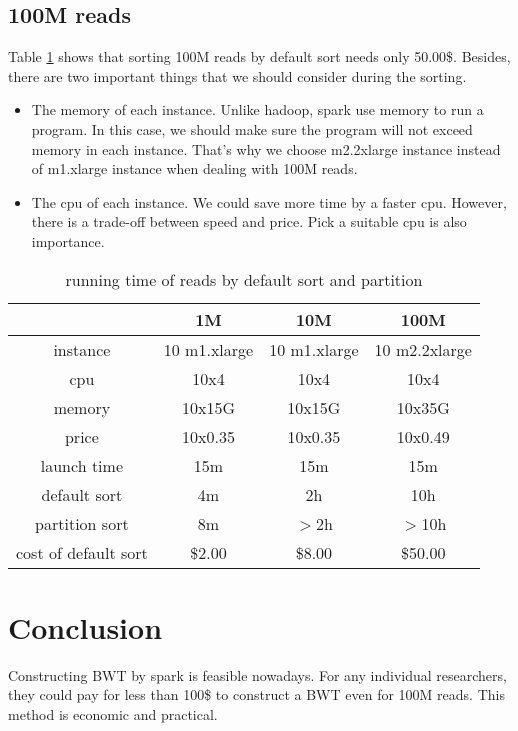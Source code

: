\documentclass[11pt,letterpaper]{article}
\begin{document}
\subsection{100M reads}
Table \ref{100M reads} shows that sorting 100M reads by default sort needs only 50.00\$. Besides, there are two important things that we should consider during the sorting. 
\begin{itemize}
	\item
	The memory of each instance. Unlike hadoop, spark use memory to run a program. In this case, we should make sure the program will not exceed memory in each instance. That's why we choose m2.2xlarge instance instead of m1.xlarge instance when dealing with 100M reads.
	\item
	The cpu of each instance. We could save more time by a faster cpu. However, there is a trade-off between speed and price. Pick a suitable cpu is also importance.
\end{itemize}
\begin{table}
	\caption{running time of reads by default sort and partition}
	\label{100M reads}
	\center
	\begin{tabular}{|c|c|c|c|}
		\hline
	     & 1M & 10M & 100M \\ \hline
		instance & 10 m1.xlarge & 10 m1.xlarge & 10 m2.2xlarge \\ \hline
    	cpu & 10x4 & 10x4 & 10x4 \\ \hline
		memory & 10x15G & 10x15G & 10x35G \\ \hline
		price & 10x0.35 & 10x0.35 & 10x0.49 \\ \hline
		\hline
		launch time & 15m & 15m & 15m \\ \hline
		default sort & 4m & 2h & 10h \\ \hline
		partition sort & 8m & $>$2h & $>$10h \\ \hline
		cost of default sort & \$2.00 & \$8.00 & \$50.00 \\ \hline
	\end{tabular}
\end{table}

\section{Conclusion}
Constructing BWT by spark is feasible nowadays. For any individual researchers, they could pay for less than 100\$ to construct a BWT even for 100M reads. This method is economic and practical. 
\end{document}
